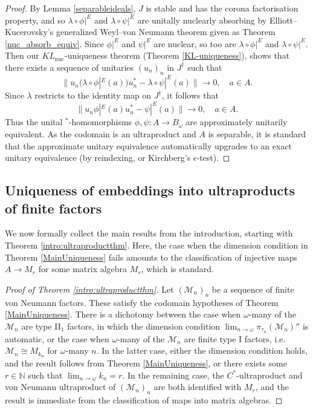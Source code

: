 \documentclass[reqno]{amsart}
\theoremstyle{definition}
\theoremstyle{remark}
\numberwithin{equation}{section}
\theoremstyle{definition}
\begin{document}
\begin{proof}
By Lemma \ref{separableideals}, $J$ is stable and has the corona factorisation property, and so $\lambda\circ \phi|^E$ and $\lambda\circ \psi|^E$ are unitally nuclearly absorbing by Elliott--Kucerovsky's generalized Weyl--von Neumann theorem given as Theorem \ref{nuc_absorb_equiv}. Since $\phi|^E$ and $\psi|^E$ are nuclear, so too are $\lambda\circ \phi|^E$ and $\lambda\circ \psi|^E$. Then our $KL_{\mathrm{nuc}}$-uniqueness theorem (Theorem \ref{KL-uniqueness}), shows that there exists a sequence of unitaries $(u_n)_{n}$ in $J^{\dagger}$ such that 
\begin{equation}
\|u_n(\lambda\circ  \phi|^E(a))u_n^*-\lambda\circ  \psi|^E(a)\|\to 0,\quad a\in A. 
\end{equation}
Since $\lambda$ restricts to the identity map on $J^\dagger$, it follows that  
\begin{equation} 
\|u_n  \phi|^E(a)u_n^*- \psi|^E(a)\|\to 0,\quad a\in A. 
\end{equation} 
Thus the unital $^*$-homomorphisms $\phi, \psi: A\rightarrow B_{\omega}$ are approximately unitarily equivalent.  As the codomain is an ultraproduct and $A$ is separable, it is standard that the approximate unitary equivalence automatically upgrades to an exact unitary equivalence (by reindexing, or Kirchberg's $\epsilon$-test).
\end{proof} 

\subsection{Uniqueness of embeddings into ultraproducts of finite factors} 
We now formally collect the main results from the introduction, starting with Theorem \ref{intro:ultraproductthm}.  Here, the case when the dimension condition in Theorem \ref{MainUniqueness} fails amounts to the classification of injective maps $A\to M_r$ for some matrix algebra $M_r$, which is standard. 
\begin{proof}[Proof of Theorem \ref{intro:ultraproductthm}]
Let $(\mathcal M_n)_{n}$ be a sequence of finite von Neumann factors. These satisfy the codomain hypotheses of Theorem \ref{MainUniqueness}. There is a dichotomy between the case when $\omega$-many of the $\mathcal M_n$ are type II$_1$ factors, in which the dimension condition $\lim_{n\to\omega}\pi_{\tau_n}(\mathcal M_n)''$ is automatic, or the case when $\omega$-many of the $\mathcal M_n$ are finite type I factors, i.e. $\mathcal M_n\cong M_{k_n}$ for $\omega$-many $n$. In the latter case, either the dimension condition holds, and the result follows from Theorem \ref{MainUniqueness}, or there exists some $r\in\mathbb N$ such that $\lim_{n\to\omega}k_n=r$. In the remaining case, 
the $C^*$-ultraproduct and von Neumann ultraproduct of $(\mathcal M_n)_{n}$ are both identified with $M_r$, and the result is immediate from the classification of maps into matrix algebras.\end{proof}
\end{document}
